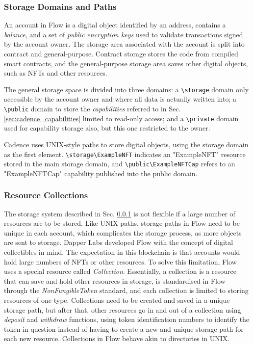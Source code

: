 \documentclass[../NFTComp_IEEE.tex]{subfiles}
\begin{document}
\subsubsection{Storage Domains and Paths}
\label{sec:cadence_storage_domain}
An account in Flow is a digital object identified by an address, contains a \textit{balance}, and a set of \textit{public encryption keys} used to validate transactions signed by the account owner. The storage area associated with the account is split into contract and general-purpose. Contract storage stores the code from compiled smart contracts, and the general-purpose storage area saves other digital objects, such as NFTs and other resources.
\par
The general storage space is divided into three domains: a \verb|\storage| domain only accessible by the account owner and where all data is actually written into; a \verb|\public| domain to store the \textit{capabilities} referred to in Sec. \ref{sec:cadence_capabilities} limited to read-only access; and a \verb|\private| domain used for capability storage also, but this one restricted to the owner.
\par
Cadence uses UNIX-style paths to store digital objects, using the storage domain as the first element. \verb|\storage\ExampleNFT| indicates an "ExampleNFT" resource stored in the main storage domain, and \verb|\public\ExampleNFTCap| refers to an "ExampleNFTCap" capability published into the public domain.

\subsubsection{Resource Collections}
\label{sec:resource_collections}
The storage system described in Sec. \ref{sec:cadence_storage_domain} is not flexible if a large number of resources are to be stored. Like UNIX paths, storage paths in Flow need to be unique in each account, which complicates the storage process, as more objects are sent to storage. Dapper Labs developed Flow with the concept of digital collectibles in mind. The expectation in this blockchain is that accounts would hold large numbers of NFTs or other resources. To solve this limitation, Flow uses a special resource called \textit{Collection}. Essentially, a collection is a resource that can save and hold other resources in storage, is standardised in Flow through the \textit{NonFungibleToken} standard, and each collection is limited to storing resources of one type. Collections need to be created and saved in a unique storage path, but after that, other resources go in and out of a collection using \textit{deposit} and \textit{withdraw} functions, using token identification numbers to identify the token in question instead of having to create a new and unique storage path for each new resource. Collections in Flow behave akin to directories in UNIX.
\end{document}
